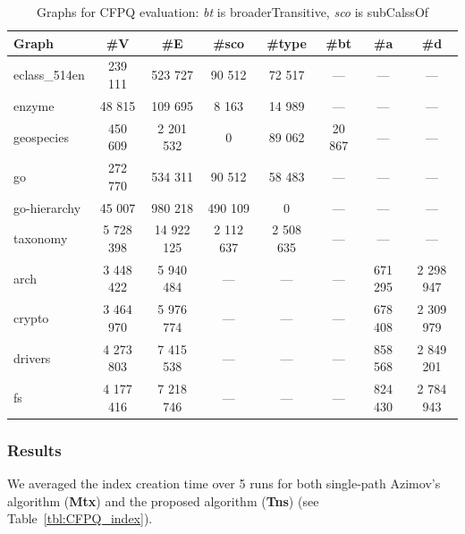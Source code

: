 {\setlength{\tabcolsep}{0.3em}
\begin{table}
    \centering
{
\caption{Graphs for CFPQ evaluation: \textit{bt} is broaderTransitive, \textit{sco} is subCalssOf}
\label{tbl:graphs_for_cfpq}
\scriptsize
{}
\begin{tabular}{|l|c|c|c|c|c|c|c|}
\hline
Graph          & \#V       & \#E        & \#sco & \#type &\#bt & \#a  & \#d \\
\hline
\hline
eclass\_514en  & 239 111    & 523 727    & 90 512    & 72 517    &        ---        & ---  & --- \\
enzyme         & 48 815     & 109 695    & 8 163     & 14 989    &        ---        & ---  & --- \\
geospecies     & 450 609    & 2 201 532  & 0         & 89 062    &        20 867     & ---  & --- \\
go             & 272 770    & 534 311    & 90 512    & 58 483    &        ---        & ---  & --- \\
go-hierarchy   & 45 007     & 980 218    & 490 109   & 0         &        ---        & ---  & --- \\
taxonomy       & 5 728 398  & 14 922 125 & 2 112 637 & 2 508 635 &        ---        & ---  & --- \\
\hline
arch           & 3 448 422  & 5 940 484  &      ---     &  ---   &        ---        & 671 295 & 2 298 947 \\
crypto         & 3 464 970  & 5 976 774  &      ---     &  ---   &        ---        & 678 408 & 2 309 979 \\
drivers        & 4 273 803  & 7 415 538  &      ---     &  ---   &        ---        & 858 568 & 2 849 201 \\
fs             & 4 177 416  & 7 218 746  &      ---     &  ---   &        ---        & 824 430 & 2 784 943 \\
\hline
\end{tabular}
}
\end{table}
}
\subsubsection{Results}

We averaged the index creation time over 5 runs for both single-path Azimov's algorithm (\textbf{Mtx}) and the proposed algorithm (\textbf{Tns}) (see Table~\ref{tbl:CFPQ_index}).

